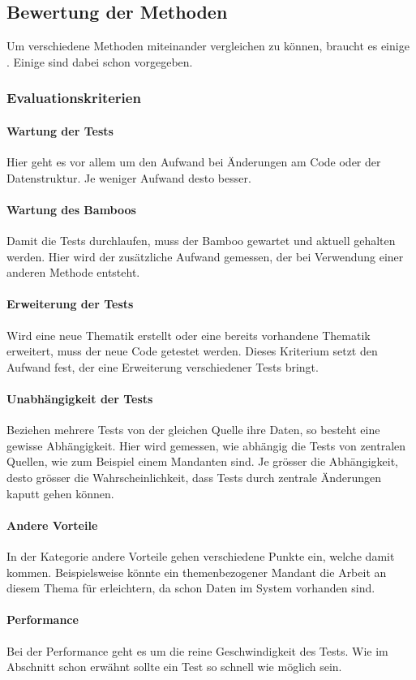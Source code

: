 \subsection{Bewertung der Methoden}
Um verschiedene Methoden miteinander vergleichen zu können, braucht es einige . Einige sind dabei schon vorgegeben.
\subsubsection{Evaluationskriterien}
\paragraph{Wartung der Tests}
Hier geht es vor allem um den Aufwand bei Änderungen am Code oder der Datenstruktur. Je weniger Aufwand desto besser. 
\paragraph{Wartung des Bamboos}
Damit die Tests durchlaufen, muss der Bamboo gewartet und aktuell gehalten werden. Hier wird der zusätzliche Aufwand gemessen, der bei Verwendung einer anderen Methode entsteht.
\paragraph{Erweiterung der Tests}
Wird eine neue Thematik erstellt oder eine bereits vorhandene Thematik erweitert, muss der neue Code getestet werden. Dieses Kriterium setzt den Aufwand fest, der eine Erweiterung verschiedener Tests bringt.
\paragraph{Unabhängigkeit der Tests}
Beziehen mehrere Tests von der gleichen Quelle ihre Daten, so besteht eine gewisse Abhängigkeit. Hier wird gemessen, wie abhängig die Tests von zentralen Quellen, wie zum Beispiel einem Mandanten sind. Je grösser die Abhängigkeit, desto grösser die Wahrscheinlichkeit, dass Tests durch zentrale Änderungen kaputt gehen können.
\paragraph{Andere Vorteile}
In der Kategorie andere Vorteile gehen verschiedene Punkte ein, welche damit kommen. Beispielsweise könnte ein themenbezogener Mandant die Arbeit an diesem Thema für erleichtern, da schon Daten im System vorhanden sind. 
\paragraph{Performance}
Bei der Performance geht es um die reine Geschwindigkeit des Tests. Wie im Abschnitt  schon erwähnt sollte ein Test so schnell wie möglich sein.
